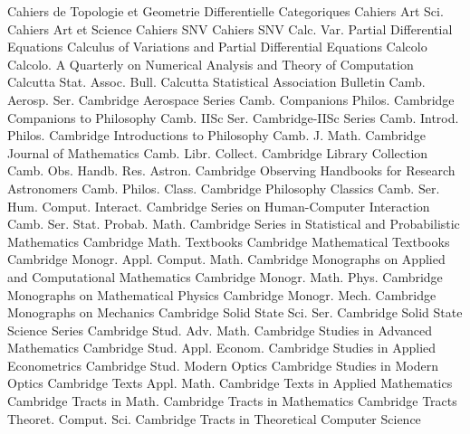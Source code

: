 {Cahiers de Topologie et Geometrie Differentielle Categoriques}
{Cahiers Art Sci.}
{Cahiers Art et Science}
{Cahiers SNV}
{Cahiers SNV}
{Calc. Var. Partial Differential Equations}
{Calculus of Variations and Partial Differential Equations}
{Calcolo}
{Calcolo. A Quarterly on Numerical Analysis and Theory of Computation}
{Calcutta Stat. Assoc. Bull.}
{Calcutta Statistical Association Bulletin}
{Camb. Aerosp. Ser.}
{Cambridge Aerospace Series}
{Camb. Companions Philos.}
{Cambridge Companions to Philosophy}
{Camb. IISc Ser.}
{Cambridge-IISc Series}
{Camb. Introd. Philos.}
{Cambridge Introductions to Philosophy}
{Camb. J. Math.}
{Cambridge Journal of Mathematics}
{Camb. Libr. Collect.}
{Cambridge Library Collection}
{Camb. Obs. Handb. Res. Astron.}
{Cambridge Observing Handbooks for Research Astronomers}
{Camb. Philos. Class.}
{Cambridge Philosophy Classics}
{Camb. Ser. Hum. Comput. Interact.}
{Cambridge Series on Human-Computer Interaction}
{Camb. Ser. Stat. Probab. Math.}
{Cambridge Series in Statistical and Probabilistic Mathematics}
{Cambridge Math. Textbooks}
{Cambridge Mathematical Textbooks}
{Cambridge Monogr. Appl. Comput. Math.}
{Cambridge Monographs on Applied and Computational Mathematics}
{Cambridge Monogr. Math. Phys.}
{Cambridge Monographs on Mathematical Physics}
{Cambridge Monogr. Mech.}
{Cambridge Monographs on Mechanics}
{Cambridge Solid State Sci. Ser.}
{Cambridge Solid State Science Series}
{Cambridge Stud. Adv. Math.}
{Cambridge Studies in Advanced Mathematics}
{Cambridge Stud. Appl. Econom.}
{Cambridge Studies in Applied Econometrics}
{Cambridge Stud. Modern Optics}
{Cambridge Studies in Modern Optics}
{Cambridge Texts Appl. Math.}
{Cambridge Texts in Applied Mathematics}
{Cambridge Tracts in Math.}
{Cambridge Tracts in Mathematics}
{Cambridge Tracts Theoret. Comput. Sci.}
{Cambridge Tracts in Theoretical Computer Science}
